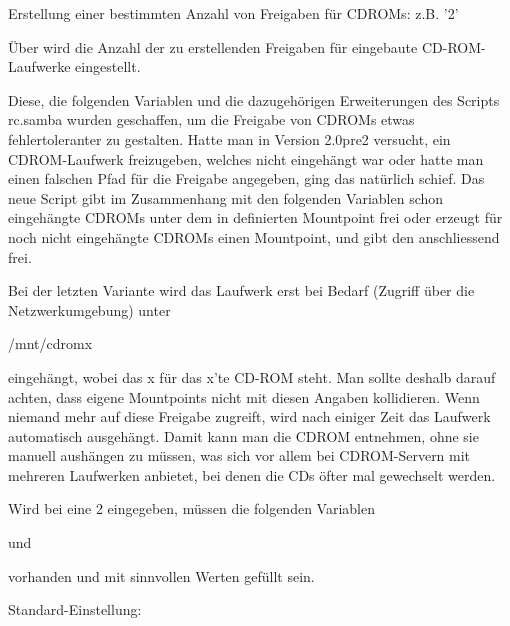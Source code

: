 \begin{description}

    Erstellung einer bestimmten Anzahl von Freigaben für CDROMs: z.B. '2'

        Über  wird die Anzahl der zu erstellenden Freigaben
        für eingebaute CD-ROM-Laufwerke eingestellt.

        Diese, die folgenden Variablen und die dazugehörigen Erweiterungen
        des Scripts rc.samba wurden geschaffen, um die Freigabe von CDROMs
        etwas fehlertoleranter zu gestalten.
        Hatte man in Version 2.0pre2 versucht, ein CDROM-Laufwerk freizugeben,
        welches nicht eingehängt war oder hatte man einen falschen Pfad für
        die Freigabe angegeben, ging das natürlich schief.
        Das neue Script gibt im Zusammenhang mit den folgenden Variablen schon
        eingehängte CDROMs unter dem in  definierten Mountpoint
        frei oder erzeugt für noch nicht eingehängte CDROMs einen Mountpoint,
        und gibt den anschliessend frei.

        Bei der letzten Variante wird das Laufwerk erst bei Bedarf
        (Zugriff über die Netzwerkumgebung) unter

        /mnt/cdromx

        eingehängt, wobei das x für das x'te CD-ROM steht. Man sollte deshalb
        darauf achten, dass eigene Mountpoints nicht mit diesen Angaben
        kollidieren.
        Wenn niemand mehr auf diese Freigabe zugreift, wird nach einiger Zeit
        das Laufwerk automatisch ausgehängt. Damit kann man die CDROM entnehmen,
        ohne sie manuell aushängen zu müssen, was sich vor allem bei
        CDROM-Servern mit mehreren Laufwerken anbietet, bei denen die CDs öfter
        mal gewechselt werden.


        Wird bei  eine 2 eingegeben, müssen die folgenden Variablen


        und


        vorhanden und mit sinnvollen Werten gefüllt sein.

        Standard-Einstellung:     

\end{description}


